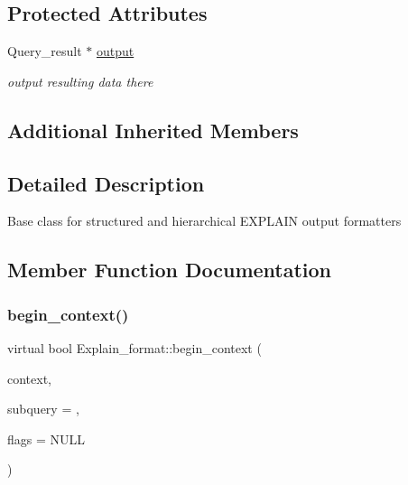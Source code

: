 \subsection*{Protected Attributes}
\begin{DoxyCompactItemize}
\item 
\mbox{\label{classExplain__format_a10101f444ad32534d35e58c088543a5e}} 
Query\+\_\+result $\ast$ \mbox{\hyperlink{classExplain__format_a10101f444ad32534d35e58c088543a5e}{output}}
\begin{DoxyCompactList}\small\item\em output resulting data there \end{DoxyCompactList}\end{DoxyCompactItemize}
\subsection*{Additional Inherited Members}


\subsection{Detailed Description}
Base class for structured and hierarchical E\+X\+P\+L\+A\+IN output formatters 

\subsection{Member Function Documentation}
\mbox{\label{classExplain__format_aedfa1f1b941f522948707e4fa3368f79}} 
\subsubsection{\texorpdfstring{begin\+\_\+context()}{begin\_context()}}
{\footnotesize\ttfamily virtual bool Explain\+\_\+format\+::begin\+\_\+context (\begin{DoxyParamCaption}\item[{enum\+\_\+parsing\+\_\+context}]{context,  }\item[{S\+E\+L\+E\+C\+T\+\_\+\+L\+E\+X\+\_\+\+U\+N\+IT $\ast$}]{subquery = {},  }\item[{const \mbox{\hyperlink{classExplain__format__flags}{Explain\+\_\+format\+\_\+flags}} $\ast$}]{flags = {\ttfamily NULL} }\end{DoxyParamCaption})\hspace{0.3cm}{\ttfamily [pure virtual]}}

